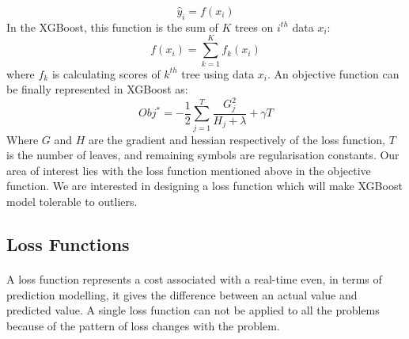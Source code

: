 \documentclass[runningheads]{llncs}
\begin{document}
\begin{equation}
    \hat{y}_i = f(x_i)
\end{equation}
In the XGBoost, this function is the sum of $K$ trees on $i^{th}$ data $x_i$:
\begin{equation}
    f(x_i) = \sum^K_{k=1} f_k(x_i)
\end{equation}
where $f_k$ is calculating scores of $k^{th}$ tree using data $x_i$. An objective function can be finally represented in XGBoost as:
\begin{equation}
	Obj^*  =  -\frac{1}{2}\sum_{j=1}^T \frac{G_j^2}{H_j + \lambda} + \gamma T
\end{equation}
Where $G$ and $H$ are the gradient and hessian respectively of the loss function, $T$ is the number of leaves, and remaining symbols are regularisation constants. Our area of interest lies with the loss function mentioned above in the objective function. We are interested in designing a loss function which will make XGBoost model tolerable to outliers.

\subsection{Loss Functions}
\paragraph{} A loss function represents a cost associated with a real-time even, in terms of prediction modelling, it gives the difference between an actual value and predicted value. A single loss function can not be applied to all the problems because of the pattern of loss changes with the problem.

\end{document}
